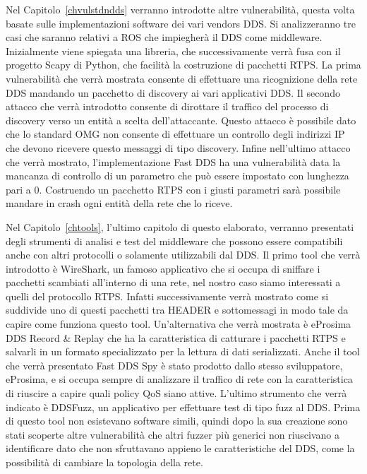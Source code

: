 Nel Capitolo~\ref{chvulstdndds} verranno introdotte altre vulnerabilità,
questa volta basate sulle implementazioni software dei vari vendors DDS. 
Si analizzeranno tre casi che saranno relativi a ROS che impiegherà 
il DDS come middleware. Inizialmente viene spiegata una libreria, che
successivamente verrà fusa con il progetto Scapy di Python, che facilità
la costruzione di pacchetti RTPS. La prima vulnerabilità che verrà 
mostrata consente di effettuare una ricognizione della rete DDS 
mandando un pacchetto di discovery ai vari applicativi DDS.
Il secondo attacco che verrà introdotto consente di dirottare il traffico 
del processo di discovery verso un entità a scelta dell'attaccante.
Questo attacco è possibile dato che lo standard OMG non consente 
di effettuare un controllo degli indirizzi IP che devono ricevere 
questo messaggi di tipo discovery.
Infine nell'ultimo attacco che verrà mostrato, l'implementazione 
Fast DDS ha una vulnerabilità data la mancanza di controllo di 
un parametro che può essere impostato con lunghezza pari a 0. 
Costruendo un pacchetto RTPS con i giusti parametri sarà possibile 
mandare in crash ogni entità della rete che lo riceve.

Nel Capitolo~\ref{chtools}, l'ultimo capitolo di questo elaborato,
verranno presentati degli strumenti di analisi e test del middleware 
che possono essere compatibili anche con altri protocolli o solamente
utilizzabili dal DDS. Il primo tool che verrà introdotto è WireShark, 
un famoso applicativo che si occupa di sniffare i pacchetti scambiati 
all'interno di una rete, nel nostro caso siamo interessati a quelli 
del protocollo RTPS. Infatti successivamente verrà mostrato come 
si suddivide uno di questi pacchetti tra HEADER e sottomessagi in 
modo tale da capire come funziona questo tool. Un'alternativa 
che verrà mostrata è eProsima DDS Record \&
Replay che ha la caratteristica di catturare i pacchetti RTPS e salvarli 
in un formato specializzato per la lettura di dati serializzati.
Anche il tool che verrà presentato Fast DDS Spy è stato prodotto 
dallo stesso sviluppatore, eProsima, e si occupa sempre di analizzare 
il traffico di rete con la caratteristica di riuscire a capire 
quali policy QoS siano attive.
L'ultimo strumento che verrà indicato è DDSFuzz, un applicativo 
per effettuare test di tipo fuzz al DDS. Prima di questo tool non 
esistevano software simili, quindi dopo la sua creazione sono stati 
scoperte altre vulnerabilità che altri fuzzer più generici non riuscivano 
a identificare dato che non sfruttavano 
appieno le caratteristiche del DDS, 
come la possibilità di cambiare la topologia della rete.